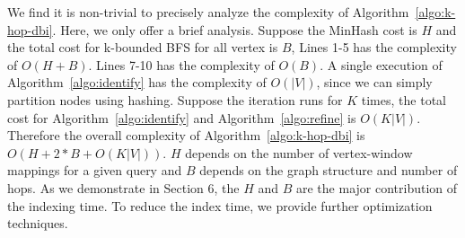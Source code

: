 We find it is non-trivial to precisely analyze the complexity of Algorithm~\ref{algo:k-hop-dbi}. Here, we only offer a brief analysis. Suppose the MinHash cost is $H$ and the total cost for k-bounded BFS for all vertex is $B$, Lines 1-5 has the complexity of $O(H + B)$.  Lines 7-10 has the complexity of $O(B)$. A single execution of Algorithm~\ref{algo:identify}  has the  complexity of $O(|V|)$, since we can simply partition nodes using hashing. Suppose the iteration runs for $K$ times, the total cost for Algorithm~\ref{algo:identify} and Algorithm~\ref{algo:refine} is $O(K|V|)$. Therefore the overall complexity of Algorithm~\ref{algo:k-hop-dbi} is $O(H+2*B + O(K|V|))$. $H$ depends on the number of vertex-window mappings for a given query and $B$ depends on the graph structure and number of hops. As we demonstrate in Section 6, the $H$ and $B$ are the major contribution of the indexing time. To reduce the index time, we provide further optimization techniques.


